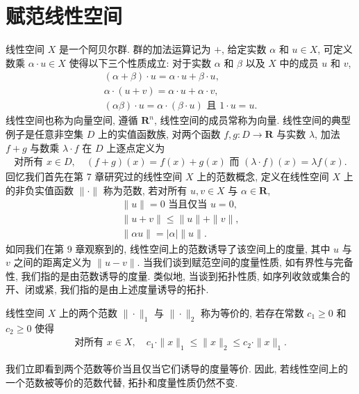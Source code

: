 \documentclass[../../main.tex]{subfiles}
\begin{document}
\section{赋范线性空间}\label{section:ch13-赋范线性空间}

线性空间 $X$ 是一个阿贝尔群. 群的加法运算记为 $+$, 给定实数 $\alpha$ 和 $u\in X$, 可定义数乘 $\alpha\cdot u\in X$ 使得以下三个性质成立: 对于实数 $\alpha$ 和 $\beta$ 以及 $X$ 中的成员 $u$ 和 $v$,
\begin{align*}
(\alpha+\beta)\cdot u=\alpha\cdot u+\beta\cdot u,\\
\alpha\cdot(u+v)=\alpha\cdot u+\alpha\cdot v,\\
(\alpha\beta)\cdot u=\alpha\cdot(\beta\cdot u)\text{ 且 }1\cdot u=u.
\end{align*}
线性空间也称为向量空间, 遵循 $\mathbf{R}^{n}$, 线性空间的成员常称为向量. 线性空间的典型例子是任意非空集 $D$ 上的实值函数族, 对两个函数 $f,g:D\to\mathbf{R}$ 与实数 $\lambda$, 加法 $f+g$ 与数乘 $\lambda\cdot f$ 在 $D$ 上逐点定义为
\begin{align*}
\text{对所有 }x\in D,\quad(f+g)(x)=f(x)+g(x)\text{ 而 }(\lambda\cdot f)(x)=\lambda f(x).
\end{align*}
回忆我们首先在第 7 章研究过的线性空间 $X$ 上的范数概念, 定义在线性空间 $X$ 上的非负实值函数 $\|\cdot\|$ 称为范数, 若对所有 $u,v\in X$ 与 $\alpha\in\mathbf{R}$,
\begin{align*}
\|u\|=0\text{ 当且仅当 }u=0,\\
\|u+v\|\leqslant\|u\|+\|v\|,\\
\|\alpha u\|=|\alpha|\|u\|.
\end{align*}
如同我们在第 9 章观察到的, 线性空间上的范数诱导了该空间上的度量, 其中 $u$ 与 $v$ 之间的距离定义为 $\|u-v\|$. 当我们谈到赋范空间的度量性质, 如有界性与完备性, 我们指的是由范数诱导的度量. 类似地, 当谈到拓扑性质, 如序列收敛或集合的开、闭或紧, 我们指的是由上述度量诱导的拓扑.

\begin{definition}[等价范数]\label{definition:ch13-等价范数}
线性空间 $X$ 上的两个范数 $\|\cdot\|_{1}$ 与 $\|\cdot\|_{2}$ 称为等价的, 若存在常数 $c_{1}\geqslant 0$ 和 $c_{2}\geqslant 0$ 使得
\begin{align*}
\text{对所有 }x\in X,\quad c_{1}\cdot\|x\|_{1}\leqslant\|x\|_{2}\leqslant c_{2}\cdot\|x\|_{1}.
\end{align*}
\end{definition}

我们立即看到两个范数等价当且仅当它们诱导的度量等价. 因此, 若线性空间上的一个范数被等价的范数代替, 拓扑和度量性质仍然不变.
\end{document}
